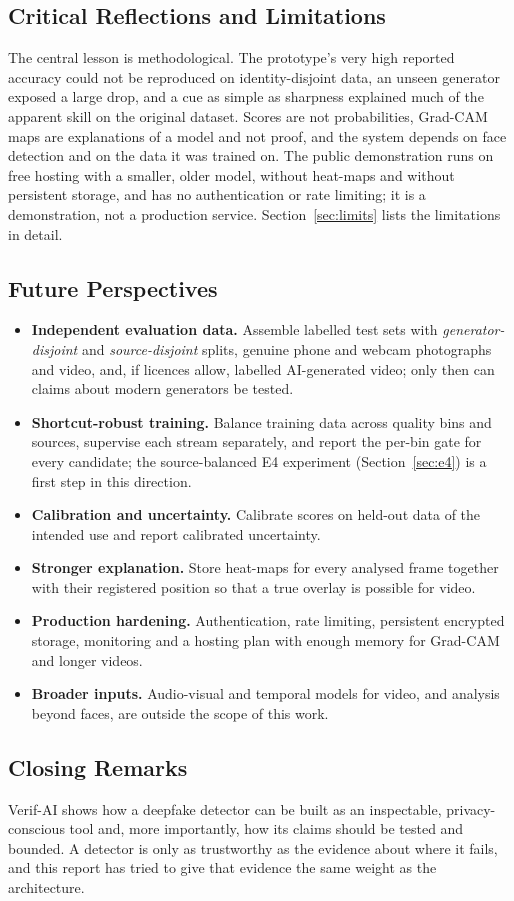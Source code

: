 \subsection{Critical Reflections and Limitations}
The central lesson is methodological. The prototype's very high reported accuracy could not be reproduced on identity-disjoint data, an
unseen generator exposed a large drop, and a cue as simple as sharpness explained much of the apparent skill on the original dataset.
Scores are not probabilities, Grad-CAM maps are explanations of a model and not proof, and the system depends on face detection and on the data it was
trained on. The public demonstration runs on free hosting with a smaller, older model, without heat-maps and without persistent storage, and has no
authentication or rate limiting; it is a demonstration, not a production service. Section~\ref{sec:limits} lists the limitations in detail.

\subsection{Future Perspectives}
\begin{itemize}
\item \textbf{Independent evaluation data.} Assemble labelled test sets with \emph{generator-disjoint} and \emph{source-disjoint} splits, genuine
phone and webcam photographs and video, and, if licences allow, labelled AI-generated video; only then can claims about modern generators be tested.
\item \textbf{Shortcut-robust training.} Balance training data across quality bins and sources, supervise each stream separately, and report the per-bin
gate for every candidate; the source-balanced E4 experiment (Section~\ref{sec:e4}) is a first step in this direction.
\item \textbf{Calibration and uncertainty.} Calibrate scores on held-out data of the intended use and report calibrated uncertainty.
\item \textbf{Stronger explanation.} Store heat-maps for every analysed frame together with their registered position so that a true overlay is possible for video.
\item \textbf{Production hardening.} Authentication, rate limiting, persistent encrypted storage, monitoring and a hosting plan with enough memory for Grad-CAM and longer videos.
\item \textbf{Broader inputs.} Audio-visual and temporal models for video, and analysis beyond faces, are outside the scope of this work.
\end{itemize}

\subsection{Closing Remarks}
Verif-AI shows how a deepfake detector can be built as an inspectable, privacy-conscious tool and, more importantly, how its claims should be tested and bounded.
A detector is only as trustworthy as the evidence about where it fails, and this report has tried to give that evidence the same weight as the architecture.
